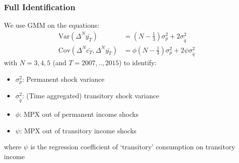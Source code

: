 \documentclass{beamer}
\begin{document}
\frame
{
	\frametitle{Full Identification}
We use GMM on the equations:
\begin{align*}
\mathrm{Var}(\Delta^N \bar{y_T} ) &=  (N-\frac{1}{3}) \sigma^2_p + 2  \sigma^2_{\tilde{q}} \\
\mathrm{Cov}(\Delta^N \bar{c_T},\Delta^N \bar{y_T} ) &= \phi (N-\frac{1}{3}) \sigma^2_p + 2 \psi \sigma^2_{\tilde{q}}
\end{align*}
with $N=3,4,5$ (and $T=2007,..,2015$) to identify:\\
\bigskip
\begin{itemize}
	\item $\sigma^2_p$: Permanent shock variance
	\item $\sigma^2_{\tilde{q}}$: (Time aggregated) transitory shock variance
	\item $\phi$: MPX out of permanent income shocks
	\item $\psi$: MPX out of transitory income shocks
\end{itemize}
\bigskip
where  $\psi$ is the regression coefficient of `transitory' consumption on transitory income
}
\frame[t]
\end{document}
